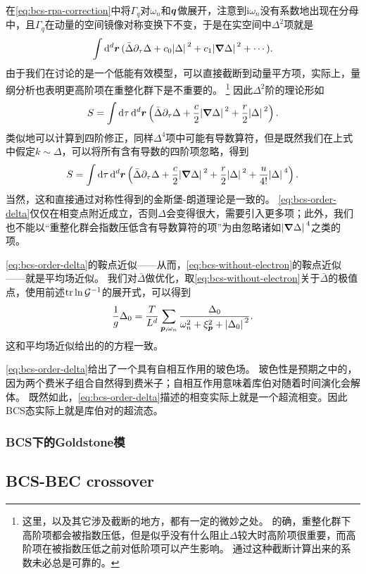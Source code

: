 \documentclass[hyperref, UTF8, a4paper]{ctexart}
\newcommand*{\ii}{\mathrm{i}}
\begin{document}
在\eqref{eq:bcs-rpa-correction}中将$\Gamma_q$对$\omega_n$和$\vb*{q}$做展开，注意到$\ii \omega_n$没有系数地出现在分母中，且$\Gamma_q$在动量的空间镜像对称变换下不变，于是在实空间中$\Delta^2$项就是
\[
    \int \dd[d]{\vb*{r}} (\bar{\Delta} \partial_\tau \Delta +  c_0 \abs*{\Delta}^2 + c_1 \abs*{\grad{\Delta}}^2 + \cdots). 
\]
由于我们在讨论的是一个低能有效模型，可以直接截断到动量平方项，实际上，量纲分析也表明更高阶项在重整化群下是不重要的。%
\footnote{
    这里，以及其它涉及截断的地方，都有一定的微妙之处。
    的确，重整化群下高阶项都会被指数压低，但是似乎没有什么阻止$\Delta$较大时高阶项很重要，而高阶项在被指数压低之前对低阶项可以产生影响。
    通过这种截断计算出来的系数未必总是可靠的。
}%
因此$\Delta^2$阶的理论形如
\begin{equation}
    S = \int \dd{\tau} \dd[d]{\vb*{r}} \left( \bar{\Delta} \partial_\tau \Delta + \frac{c}{2} \abs*{\grad{\Delta}}^2 + \frac{r}{2} \abs*{\Delta}^2 \right).
\end{equation}
类似地可以计算到四阶修正，同样$\Delta^4$项中可能有导数算符，但是既然我们在上式中假定$k \sim \Delta$，可以将所有含有导数的四阶项忽略，得到
\begin{equation}
    S = \int \dd{\tau} \dd[d]{\vb*{r}} \left( \bar{\Delta} \partial_\tau \Delta + \frac{c}{2} \abs*{\grad{\Delta}}^2 + \frac{r}{2} \abs*{\Delta}^2 + \frac{u}{4!} \abs*{\Delta}^4 \right).
    \label{eq:bcs-order-delta}
\end{equation}
当然，这和直接通过对称性得到的金斯堡-朗道理论是一致的。
\eqref{eq:bcs-order-delta}仅仅在相变点附近成立，否则$\Delta$会变得很大，需要引入更多项；此外，我们也不能以“重整化群会指数压低含有导数算符的项”为由忽略诸如$\abs*{\grad{\Delta}}^4$之类的项。

\eqref{eq:bcs-order-delta}的鞍点近似——从而，\eqref{eq:bcs-without-electron}的鞍点近似——就是平均场近似。
我们对$\bar{\Delta}$做优化，取\eqref{eq:bcs-without-electron}关于$\bar{\Delta}$的极值点，使用前述$\trace \ln \mathcal{G}^{-1}$的展开式，可以得到
\begin{equation}
    \frac{1}{g} \Delta_0 = \frac{T}{L^d} \sum_{\vb*{p}, \omega_n} \frac{\Delta_0}{\omega_n^2 + \xi_{\vb*{p}}^2 + \abs*{\Delta_0}^2} . 
\end{equation}
这和平均场近似给出的的方程一致。

\eqref{eq:bcs-order-delta}给出了一个具有自相互作用的玻色场。
玻色性是预期之中的，因为两个费米子组合自然得到费米子；自相互作用意味着库伯对随着时间演化会解体。
既然如此，\eqref{eq:bcs-order-delta}描述的相变实际上就是一个超流相变。因此BCS态实际上就是库伯对的超流态。

\subsubsection{BCS下的Goldstone模}

\subsection{BCS-BEC crossover}
\end{document}
